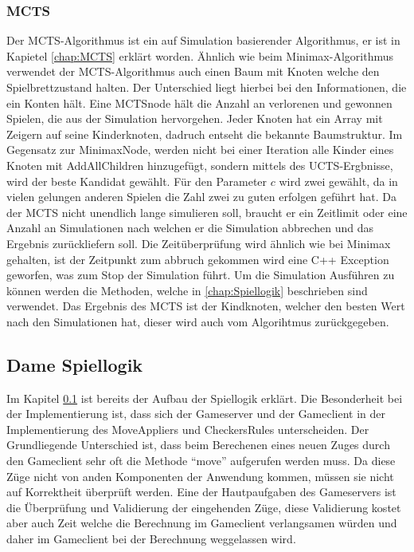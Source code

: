 \documentclass[12pt,a4paper,bibliography=totocnumbered,listof=totocnumbered]{article}
\begin{document}
\subsubsection{MCTS}
Der MCTS-Algorithmus ist ein auf Simulation basierender Algorithmus, er ist in Kapietel \ref{chap:MCTS} erklärt worden.
Ähnlich wie beim Minimax-Algorithmus verwendet der MCTS-Algorithmus auch einen Baum mit Knoten welche den Spielbrettzustand halten.
Der Unterschied liegt hierbei bei den Informationen, die ein Konten hält. Eine MCTSnode hält die Anzahl an verlorenen und gewonnen Spielen,
die aus der Simulation hervorgehen. Jeder Knoten hat ein Array mit Zeigern auf seine Kinderknoten, dadruch entseht die bekannte Baumstruktur.
Im Gegensatz zur MinimaxNode, werden nicht bei einer Iteration alle Kinder eines Knoten mit AddAllChildren hinzugefügt, sondern mittels des 
UCTS-Ergbnisse, wird der beste Kandidat gewählt. Für den Parameter $c$ wird zwei gewählt, da in vielen gelungen anderen Spielen die Zahl zwei 
zu guten erfolgen geführt hat. Da der MCTS nicht unendlich lange simulieren soll, braucht er ein Zeitlimit oder eine Anzahl an Simulationen
nach welchen er die Simulation abbrechen und das Ergebnis zurückliefern soll. Die Zeitüberprüfung wird ähnlich wie bei Minimax gehalten,
ist der Zeitpunkt zum abbruch gekommen wird eine C++ Exception geworfen, was zum Stop der Simulation führt. 
Um die Simulation Ausführen zu können werden die Methoden, welche in \ref{chap:Spiellogik} beschrieben sind verwendet.
Das Ergebnis des MCTS ist der Kindknoten, welcher den besten Wert nach den Simulationen hat, dieser wird auch vom Algorihtmus zurückgegeben.

\subsection{Dame Spiellogik}
\label{chap:Moves}
Im Kapitel \ref{chap:Moves} ist bereits der Aufbau der Spiellogik erklärt. Die Besonderheit bei der Implementierung ist, dass sich der Gameserver und 
der Gameclient in der Implementierung des MoveAppliers und CheckersRules unterscheiden. Der Grundliegende Unterschied ist, dass 
beim Berechenen eines neuen Zuges durch den Gameclient sehr oft die Methode "`move"' aufgerufen werden muss. Da diese Züge nicht von 
anden Komponenten der Anwendung kommen, müssen sie nicht auf Korrektheit überprüft werden. Eine der Hautpaufgaben des Gameservers ist die 
Überprüfung und Validierung der eingehenden Züge, diese Validierung kostet aber auch Zeit welche die Berechnung im Gameclient verlangsamen würden 
und daher im Gameclient bei der Berechnung weggelassen wird.
\end{document}
